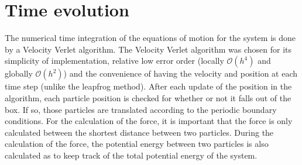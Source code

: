 \section{Time evolution}
The numerical time integration of the equations of motion for the system is done by a Velocity Verlet algorithm. The Velocity Verlet algorithm was chosen for its simplicity of implementation, relative low error order (locally $\mathcal{O}(h^4)$ and globally $\mathcal{O}(h^2)$) and the convenience of having the velocity and position at each time step (unlike the leapfrog method).
After each update of the position in the algorithm, each particle position is checked for whether or not it falls out of the box. If so, those particles are translated according to the periodic boundary conditions. For the calculation of the force, it is important that the force is only calculated between the shortest distance between two particles. During the calculation of the force, the potential energy between two particles is also calculated as to keep track of the total potential energy of the system.